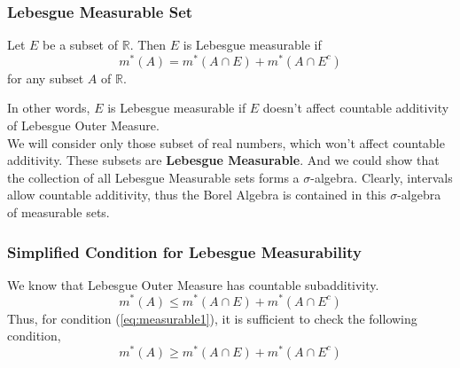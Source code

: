 \subsubsection{Lebesgue Measurable Set}
\begin{definition}
	Let $E$ be a subset of $\mathbb{R}$. Then $E$ is Lebesgue measurable if
\begin{equation}
	m^\ast(A) = m^\ast(A \cap E) + m^\ast(A \cap E^c)
	\label{eq:measurable1}
\end{equation}
	for any subset $A$ of $\mathbb{R}$.
\end{definition}

	In other words, $E$ is Lebesgue measurable if $E$ doesn't affect countable additivity of Lebesgue Outer Measure.\\

	We will consider only those subset of real numbers, which won't affect countable additivity. These subsets are \textbf{Lebesgue Measurable}. And we could show that the collection of all Lebesgue Measurable sets forms a $\sigma$-algebra. Clearly, intervals allow countable additivity, thus the Borel Algebra is contained in this $\sigma$-algebra of measurable sets.

\subsubsection{Simplified Condition for Lebesgue Measurability}

We know that Lebesgue Outer Measure has countable subadditivity.
\begin{equation*}
	m^\ast(A) \le m^\ast(A \cap E) + m^\ast(A \cap E^c)
\end{equation*}
Thus, for condition (\ref{eq:measurable1}), it is sufficient to check the following condition,
\begin{equation}
	m^\ast(A) \ge m^\ast(A \cap E) + m^\ast(A \cap E^c)
	\label{eq:measurable2}
\end{equation}

